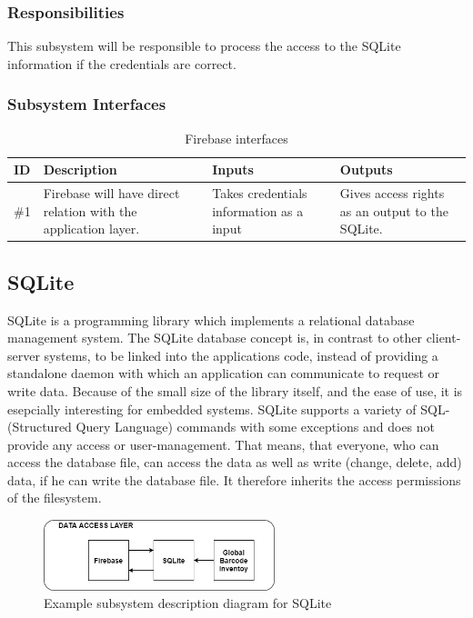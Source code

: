 \subsubsection{Responsibilities}
This subsystem will be responsible to process the access to the SQLite information if the credentials are correct.

\subsubsection{Subsystem Interfaces}
\begin {table}[H]
\caption {Firebase interfaces} 
\begin{center}
    \begin{tabular}{ | p{1cm} | p{6cm} | p{3cm} | p{3cm} |}
    \hline
    ID & Description & Inputs & Outputs \\ \hline
    \#1 & Firebase will have direct relation with the application layer. & Takes credentials information as a input  & Gives access rights as an output to the SQLite. \\ \hline
    \end{tabular}
\end{center}
\end{table}


\subsection{SQLite}
SQLite is a programming library which implements a relational database management system. The SQLite database concept is, in contrast to other client-server systems, to be linked into the applications code, instead of providing a standalone daemon with which an application can communicate to request or write data. Because of the small size of the library itself, and the ease of use, it is esepcially interesting for embedded systems. SQLite supports a variety of SQL-  (Structured Query Language) commands with some exceptions and does not provide any access or user-management. That means, that everyone, who can access the database file, can access the data as well as write (change, delete, add) data, if he can write the database file. It therefore inherits the access permissions of the filesystem. 

\begin{figure}[h!]
	\centering
 	\includegraphics[width=0.60\textwidth]{images/DS.jpg}
 \caption{Example subsystem description diagram for SQLite}
\end{figure}

